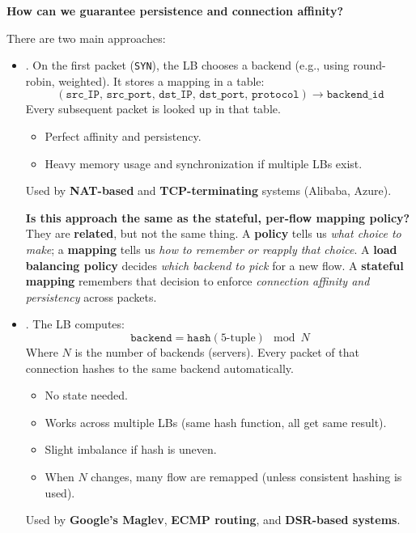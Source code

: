 \highspace
\begin{flushleft}
    \textcolor{Green3}{ \textbf{How can we guarantee persistence and connection affinity?}}
\end{flushleft}
There are two main approaches:
\begin{itemize}
    \item {}. On the first packet (\texttt{SYN}), the LB chooses a backend (e.g., using round-robin, weighted). It stores a mapping in a table:
    \begin{equation*}
        \left(
            \texttt{src\_IP},\, \texttt{src\_port},\, \texttt{dst\_IP},\, \texttt{dst\_port},\, \texttt{protocol}
        \right) \rightarrow \texttt{backend\_id}
    \end{equation*}
    Every subsequent packet is looked up in that table.
    \begin{itemize}
        \item[\textcolor{Green3}{\faIcon{check}}] Perfect affinity and persistency.
        \item[\textcolor{Red2}{\faIcon{times}}] Heavy memory usage and synchronization if multiple LBs exist.
    \end{itemize}
    Used by \textbf{NAT-based} and \textbf{TCP-terminating} systems (Alibaba, Azure).

    \textcolor{Green3}{ \textbf{Is this approach the same as the stateful, per-flow mapping policy?}} They are \textbf{related}, but not the same thing. A \textbf{policy} tells us \emph{what choice to make}; a \textbf{mapping} tells us \emph{how to remember or reapply that choice}. A \textbf{load balancing policy} decides \emph{which backend to pick} for a new flow. A \textbf{stateful mapping} remembers that decision to enforce \emph{connection affinity and persistency} across packets.


    \item {}. The LB computes:
    \begin{equation*}
        \texttt{backend} = \texttt{hash}\left(\text{5-tuple}\right) \mod N
    \end{equation*}
    Where $N$ is the number of backends (servers). Every packet of that connection hashes to the same backend automatically.
    \begin{itemize}
        \item[\textcolor{Green3}{\faIcon{check}}] No state needed.
        \item[\textcolor{Green3}{\faIcon{check}}] Works across multiple LBs (same hash function, all get same result).
        \item[\textcolor{Red2}{\faIcon{times}}] Slight imbalance if hash is uneven.
        \item[\textcolor{Red2}{\faIcon{times}}] When $N$ changes, many flow are remapped (unless consistent hashing is used).
    \end{itemize}
    Used by \textbf{Google's Maglev}, \textbf{ECMP routing}, and \textbf{DSR-based systems}.
\end{itemize}

